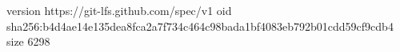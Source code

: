version https://git-lfs.github.com/spec/v1
oid sha256:b4d4ae14e135dea8fca2a7f734c464c98bada1bf4083eb792b01cdd59cf9cdb4
size 6298
